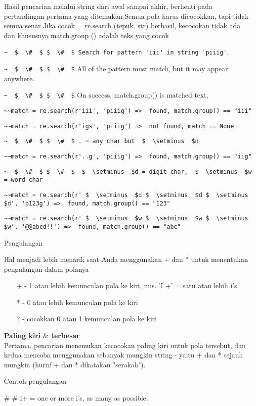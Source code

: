 \begin {enumerate}
\begin {enumerate}
Hasil pencarian melalui string dari awal sampai akhir, berhenti pada pertandingan pertama yang ditemukan  Semua pola harus dicocokkan, tapi tidak semua senar Jika cocok = re.search (tepuk, str) berhasil, kecocokan tidak ada dan khususnya match.group () adalah teks yang cocok

\verb|~  $  \#  $ $  \#  $ Search for pattern 'iii' in string 'piiig'|.

\verb|~  $  \#  $ $  \#  $| All of the pattern must match, but it may appear anywhere.

\verb|~  $  \#  $ $  \#  $| On success, match.group() is matched text.

\verb|~~match = re.search(r'iii', 'piiig') =>  found, match.group() == "iii"|

\verb|~~match = re.search(r'igs', 'piiig') =>  not found, match == None|

\verb|~  $  \#  $ $  \#  $ . = any char but  $  \setminus  $n|

\verb|~~match = re.search(r'..g', 'piiig') =>  found, match.group() == "iig"|

\verb|~  $  \#  $ $  \#  $  $  \setminus  $d = digit char,  $  \setminus  $w = word char|

\verb|~~match = re.search(r' $  \setminus  $d $  \setminus  $d $  \setminus  $d', 'p123g') =>  found, match.group() == "123"|

\verb|~~match = re.search(r' $  \setminus  $w $  \setminus  $w $  \setminus  $w', '@@abcd!!') =>  found, match.group() == "abc"|

Pengulangan

Hal menjadi lebih menarik saat Anda menggunakan + dan * untuk menentukan pengulangan dalam polanya

~~~ + - 1 atau lebih kemunculan pola ke kiri, mis. 'I +' = satu atau lebih i's

~~~ * - 0 atau lebih kemunculan pola ke kiri

~~~ ? - cocokkan 0 atau 1 kemunculan pola ke kiri

{\fontsize{14pt}{14pt}\selectfont \textbf{Paling kiri  $  \&  $ terbesar} \\}
Pertama, pencarian menemukan kecocokan paling kiri untuk pola tersebut, dan kedua mencoba menggunakan sebanyak mungkin string - yaitu + dan * sejauh mungkin (huruf + dan * dikatakan "serakah").

Contoh pengulangan

 $  \#  $ $  \#  $ i+ = one or more i's, as many as possible.


\end{enumerate}
\end{enumerate}
